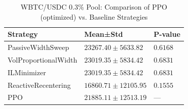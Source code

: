 \begin{table}
\caption{WBTC/USDC 0.3\% Pool: Comparison of PPO (optimized) vs. Baseline Strategies}
\label{tab:baseline_comparison_wbtc}
\begin{tabular}{lll}
\toprule
Strategy & Mean±Std & P-value \\
\midrule
PassiveWidthSweep & $23267.40 \pm 5633.82$ & $0.6168$ \\
VolProportionalWidth & $23019.35 \pm 5834.42$ & $0.6831$ \\
ILMinimizer & $23019.35 \pm 5834.42$ & $0.6831$ \\
ReactiveRecentering & $16860.71 \pm 12105.95$ & $0.1555$ \\
PPO & $21885.11 \pm 12513.19$ & — \\
\bottomrule
\end{tabular}
\end{table}
